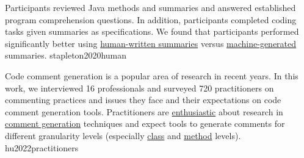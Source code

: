 \documentclass{article}
\begin{document}
  {Participants reviewed Java methods and summaries and answered established program comprehension questions. In addition, participants completed coding tasks given summaries as specifications. We found that participants performed significantly better using \ul{human-written summaries} versus \ul{machine-generated} summaries.}
  {stapleton2020human}

  {Code comment generation is a popular area of research in recent years. In this work, we interviewed 16 professionals and surveyed 720 practitioners on commenting practices and issues they face and their expectations on code comment generation tools. Practitioners are \ul{enthusiastic} about research in \ul{comment generation} techniques and expect tools to generate comments for different granularity levels (especially \ul{class} and \ul{method} levels).}
  {hu2022practitioners}

\end{document}

